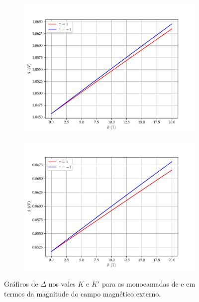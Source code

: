 \begin{figure}[p]
  \centering
  \begin{subfigure}{\textwidth}
    \includegraphics[trim=0 0 0 1.0cm,clip,width=\textwidth]{imagens/crs2_bandgap_field.png}
    \caption{}
    \label{fig:crs2_bandgap_field}
  \end{subfigure}
  \begin{subfigure}{\textwidth}
    \includegraphics[trim=0 0 0 1.0cm,clip,width=\textwidth]{imagens/crse2_bandgap_field.png}
    \caption{}
    \label{fig:crse2_bandgap_field}
  \end{subfigure}
  \caption{
    Gráficos de $\Delta$ nos vales $K$ e $K'$ para as monocamadas de
      e 
     em termos da magnitude do campo magnético externo.
  }
  \label{fig:bandgap_field}
\end{figure}

